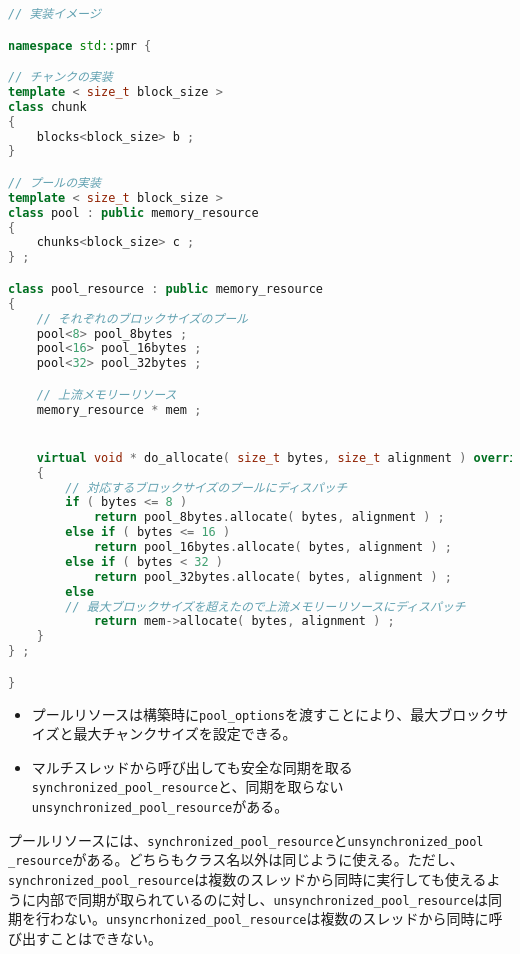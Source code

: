\begin{lstlisting}[language=C++]
// 実装イメージ

namespace std::pmr {

// チャンクの実装
template < size_t block_size >
class chunk
{
    blocks<block_size> b ;
}

// プールの実装
template < size_t block_size >
class pool : public memory_resource
{
    chunks<block_size> c ;
} ;

class pool_resource : public memory_resource
{
    // それぞれのブロックサイズのプール
    pool<8> pool_8bytes ;
    pool<16> pool_16bytes ;
    pool<32> pool_32bytes ;

    // 上流メモリーリソース
    memory_resource * mem ;


    virtual void * do_allocate( size_t bytes, size_t alignment ) override
    {
        // 対応するブロックサイズのプールにディスパッチ
        if ( bytes <= 8 )
            return pool_8bytes.allocate( bytes, alignment ) ;
        else if ( bytes <= 16 )
            return pool_16bytes.allocate( bytes, alignment ) ;
        else if ( bytes < 32 )
            return pool_32bytes.allocate( bytes, alignment ) ;
        else
        // 最大ブロックサイズを超えたので上流メモリーリソースにディスパッチ
            return mem->allocate( bytes, alignment ) ;
    }
} ;

}
\end{lstlisting}

\begin{itemize}[leftmargin=*]
\item
  プールリソースは構築時に\lstinline!pool_options!を渡すことにより、最大ブロックサイズと最大チャンクサイズを設定できる。
\item
  マルチスレッドから呼び出しても安全な同期を取る\lstinline!synchronized_pool_resource!と、同期を取らない\lstinline!unsynchronized_pool_resource!がある。
\end{itemize}

%

プールリソースには、\lstinline!synchronized_pool_resource!と\lstinline[breaklines=true]!unsynchronized_pool _resource!がある。どちらもクラス名以外は同じように使える。ただし、\lstinline!synchronized_pool_resource!は複数のスレッドから同時に実行しても使えるように内部で同期が取られているのに対し、\lstinline!unsynchronized_pool_resource!は同期を行わない。\lstinline!unsyncrhonized_pool_resource!は複数のスレッドから同時に呼び出すことはできない。

